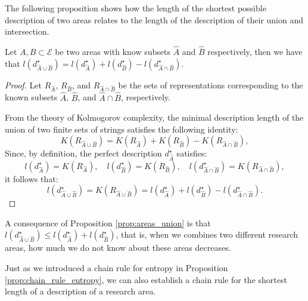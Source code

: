 The following proposition shows how the length of the shortest possible description of two areas relates to the length of the description of their union and intersection.

\begin{proposition}
\label{prop:areas_union}
Let $A, B \subset \mathcal{E}$ be two areas with know subsets $\hat{A}$ and $\hat{B}$ respectively, then we have that $l \left( d_{\hat{A} \cup \hat{B}}^{\star} \right) = l \left( d_{\hat{A}}^{\star} \right) + l \left( d_{\hat{B}}^{\star} \right) - l \left( d_{\hat{A} \cap \hat{B}}^{\star} \right)$.
\end{proposition}
\begin{proof}
Let $R_{\hat{A}}$, $R_{\hat{B}}$, and $R_{\hat{A} \cap \hat{B}}$ be the sets of representations corresponding to the known subsets $\hat{A}$, $\hat{B}$, and $\hat{A} \cap \hat{B}$, respectively.

From the theory of Kolmogorov complexity, the minimal description length of the union of two finite sets of strings satisfies the following identity:
$$
K(R_{\hat{A} \cup \hat{B}}) = K(R_{\hat{A}}) + K(R_{\hat{B}}) - K(R_{\hat{A} \cap \hat{B}}),
$$
Since, by definition, the perfect description $d_{\hat{A}}^\star$ satisfies:
$$
l(d_{\hat{A}}^\star) = K(R_{\hat{A}}), \quad l(d_{\hat{B}}^\star) = K(R_{\hat{B}}), \quad l(d_{\hat{A} \cap \hat{B}}^\star) = K(R_{\hat{A} \cap \hat{B}}),
$$
it follows that:
$$
l(d_{\hat{A} \cup \hat{B}}^\star) = K(R_{\hat{A} \cup \hat{B}}) = l(d_{\hat{A}}^\star) + l(d_{\hat{B}}^\star) - l(d_{\hat{A} \cap \hat{B}}^\star).
$$
\end{proof}

A consequence of Proposition \ref{prop:areas_union} is that $l \left( d_{\hat{A} \cup \hat{B}}^{\star} \right) \leq l \left( d_{\hat{A}}^{\star} \right) + l \left( d_{\hat{B}}^{\star} \right)$, that is, when we combines two different research areas, how much we do not know about these areas decreases.

Just as we introduced a chain rule for entropy in Proposition \ref{prop:chain_rule_entropy}, we can also establish a chain rule for the shortest length of a description of a research area.

